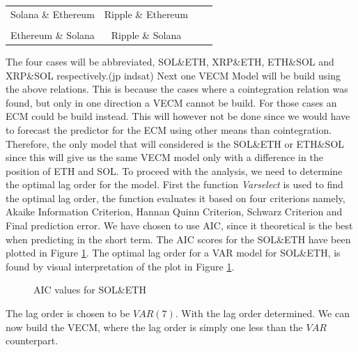 \pause
\begin{center}
\begin{tabular}{cccc}
   Solana \& Ethereum \quad & \quad Ripple \& Ethereum\\\\
   Ethereum \& Solana \quad & \quad Ripple \& Solana
\end{tabular}
\end{center}
\pause
\noindent The four cases will be abbreviated, SOL\&ETH, XRP\&ETH, ETH\&SOL and XRP\&SOL respectively.(jp indsat) Next one VECM Model will be build using the above relations. This is because the cases where a cointegration relation was found, but only in one direction a VECM cannot be build. For those cases an ECM could be build instead. This will however not be done since we would have to forecast the predictor for the ECM using other means than cointegration. Therefore, the only model that will considered is the SOL\&ETH or ETH\&SOL since this will give us the same VECM model only with a difference in the position of ETH and SOL. To proceed with the analysis, we need to determine the optimal lag order for the model. First the function \textit{Varselect} is used to find the optimal lag order, the function evaluates it based on four criterions namely, Akaike Information Criterion, Hannan Quinn Criterion, Schwarz Criterion and Final prediction error. We have chosen to use AIC, since it theoretical is the best when predicting in the short term. The AIC scores for the SOL\&ETH have been plotted in Figure \ref{fig:AIC_plots}. The optimal lag order for a VAR model for SOL\&ETH, is found by visual interpretation of the plot in Figure \ref{fig:AIC_plots}.
\begin{figure}[H]
  \centering
  \quad
  
  \caption{AIC values for SOL\&ETH}
  \label{fig:AIC_plots}
\end{figure}
\noindent The lag order is chosen to be $VAR(7)$. With the lag order determined. We can now build the VECM, where the lag order is simply one less than the $VAR$ counterpart.

